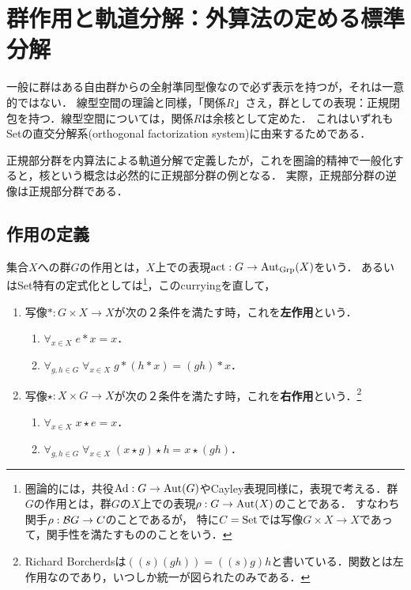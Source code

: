 \documentclass[uplatex,dvipdfmx]{jsreport}
\begin{document}
\section{群作用と軌道分解：外算法の定める標準分解}

\begin{tcolorbox}[colframe=ForestGreen, colback=ForestGreen!10!white, breakable ,colbacktitle=ForestGreen!40!white, coltitle=black,fonttitle=\bfseries\sffamily,
    title=]
    一般に群はある自由群からの全射準同型像なので必ず表示を持つが，それは一意的ではない．
    線型空間の理論と同様，「関係$R$」さえ，群としての表現：正規閉包を持つ．線型空間については，関係$R$は余核として定めた．
    これはいずれもSetの直交分解系(orthogonal factorization system)に由来するためである．

    正規部分群を内算法による軌道分解で定義したが，これを圏論的精神で一般化すると，核という概念は必然的に正規部分群の例となる．
    実際，正規部分群の逆像は正規部分群である．
\end{tcolorbox}

\subsection{作用の定義}

\begin{definition}\label{def-group-action}
    集合$X$への群$G$の作用とは，$X$上での表現$\mathrm{act}:G\to\mathrm{Aut}_{\mathrm{Grp}}(X)$をいう．
    あるいはSet特有の定式化としては\footnote{圏論的には，共役$\mathrm{Ad}:G\to\mathrm{Aut}(G)$やCayley表現同様に，表現で考える．群$G$の作用とは，群$G$の$X$上での表現$\rho:G\to\mathrm{Aut}(X)$のことである．
    すなわち関手$\rho:\mathcal{B} G\to C$のことであるが，
    特に$C=\mathrm{Set}$では写像$G\times X\to X$であって，関手性を満たすもののことをいう．}，このcurryingを直して，
    \begin{enumerate}
        \item 写像$*:G\times X\to X$が次の２条件を満たす時，これを\textbf{左作用}という．\begin{enumerate}
            \item $\forall_{x\in X}\;e*x=x$．
            \item $\forall_{g,h\in G}\;\forall_{x\in X}\;g*(h*x)=(gh)*x$．
        \end{enumerate}
        \item 写像$\star:X\times G\to X$が次の２条件を満たす時，これを\textbf{右作用}という．\footnote{Richard Borcherdsは$((s)(gh))=((s)g)h$と書いている．関数とは左作用なのであり，いつしか統一が図られたのみである．}
        \begin{enumerate}
            \item $\forall_{x\in X}\;x\star e=x$．
            \item $\forall_{g,h\in G}\;\forall_{x\in X}\;(x\star g)\star h=x\star (gh)$．
        \end{enumerate}
    \end{enumerate}
\end{definition}
\end{document}
